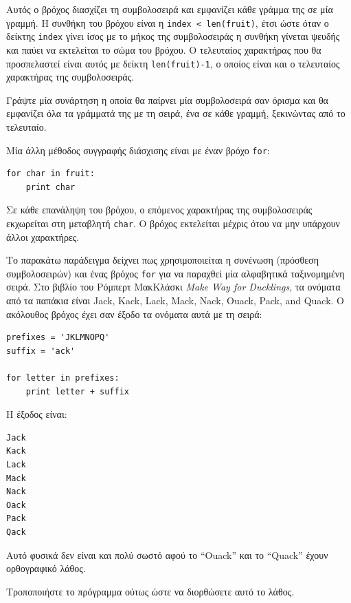 \documentclass[10pt]{book}
\begin{document}
Αυτός ο βρόχος διασχίζει τη συμβολοσειρά και εμφανίζει κάθε γράμμα της σε μία γραμμή. Η συνθήκη του βρόχου είναι η {\tt index < len(fruit)}, έτσι ώστε όταν ο δείκτης {\tt index} γίνει ίσος με το μήκος της συμβολοσειράς η συνθήκη γίνεται ψευδής και παύει να εκτελείται το σώμα του βρόχου. Ο τελευταίος χαρακτήρας που θα προσπελαστεί είναι αυτός με δείκτη {\tt len(fruit)-1}, ο οποίος είναι και ο τελευταίος χαρακτήρας της συμβολοσειράς.
\\
\begin{exercise}

Γράψτε μία συνάρτηση η οποία θα παίρνει μία συμβολοσειρά σαν όρισμα
και θα εμφανίζει όλα τα γράμματά της με τη σειρά, ένα σε κάθε γραμμή,
ξεκινώντας από το τελευταίο.
\\
\end{exercise}

Μία άλλη μέθοδος συγγραφής διάσχισης είναι με έναν βρόχο {\tt for}:

\begin{verbatim}
for char in fruit:
    print char
\end{verbatim}
%

Σε κάθε επανάληψη του βρόχου, ο επόμενος χαρακτήρας της συμβολοσειράς εκχωρείται στη μεταβλητή {\tt char}. Ο βρόχος εκτελείται μέχρις ότου να μην υπάρχουν άλλοι χαρακτήρες.

Το παρακάτω παράδειγμα δείχνει πως χρησιμοποιείται η συνένωση (πρόσθεση συμβολοσειρών) και ένας βρόχος {\tt for} για να παραχθεί μία αλφαβητικά ταξινομημένη σειρά. Στο βιβλίο του Ρόμπερτ ΜακΚλάσκι {\em Make Way for Ducklings}, τα ονόματα από τα παπάκια είναι Jack, Kack, Lack, Mack, Nack, Ouack, Pack, and Quack. Ο ακόλουθος βρόχος έχει σαν έξοδο τα ονόματα αυτά με τη σειρά:

\begin{verbatim}
prefixes = 'JKLMNOPQ'
suffix = 'ack'

for letter in prefixes:
    print letter + suffix
\end{verbatim}
%

Η έξοδος είναι:

\begin{verbatim}
Jack
Kack
Lack
Mack
Nack
Oack
Pack
Qack
\end{verbatim}
%

Αυτό φυσικά δεν είναι και πολύ σωστό αφού το ``Ouack'' και το ``Quack'' 
έχουν ορθογραφικό λάθος.
\\
\begin{exercise}

Τροποποιήστε το πρόγραμμα ούτως ώστε να διορθώσετε αυτό το λάθος.
\end{exercise}
\end{document}
